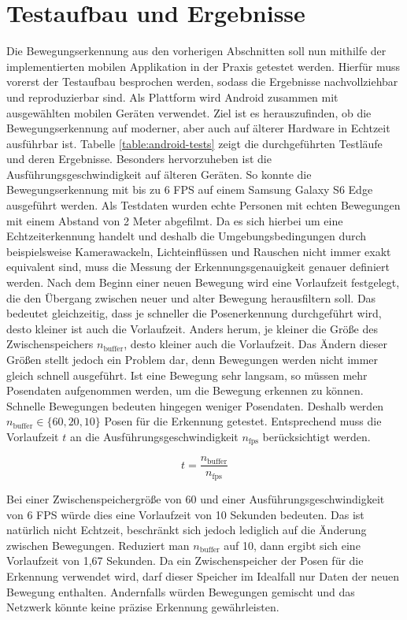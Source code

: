 \section{Testaufbau und Ergebnisse}
Die Bewegungserkennung aus den vorherigen Abschnitten soll nun mithilfe der
implementierten mobilen Applikation in der Praxis getestet werden. Hierfür muss
vorerst der Testaufbau besprochen werden, sodass die Ergebnisse nachvollziehbar
und reproduzierbar sind. Als Plattform wird Android zusammen mit ausgewählten
mobilen Geräten verwendet. Ziel ist es herauszufinden, ob die Bewegungserkennung
auf moderner, aber auch auf älterer Hardware in Echtzeit ausführbar ist. Tabelle
\ref{table:android-tests} zeigt die durchgeführten Testläufe und deren
Ergebnisse. Besonders hervorzuheben ist die Ausführungsgeschwindigkeit auf
älteren Geräten. So konnte die Bewegungserkennung mit bis zu 6 FPS auf einem
Samsung Galaxy S6 Edge ausgeführt werden. Als Testdaten wurden echte Personen
mit echten Bewegungen mit einem Abstand von 2 Meter abgefilmt. Da es sich
hierbei um eine Echtzeiterkennung handelt und deshalb die Umgebungsbedingungen
durch beispielsweise Kamerawackeln, Lichteinflüssen und Rauschen nicht immer
exakt equivalent sind, muss die Messung der Erkennungsgenauigkeit genauer
definiert werden. Nach dem Beginn einer neuen Bewegung wird eine Vorlaufzeit
festgelegt, die den Übergang zwischen neuer und alter Bewegung herausfiltern
soll. Das bedeutet gleichzeitig, dass je schneller die Posenerkennung
durchgeführt wird, desto kleiner ist auch die Vorlaufzeit. Anders herum, je
kleiner die Größe des Zwischenspeichers $n_\mathrm{buffer}$, desto kleiner auch
die Vorlaufzeit. Das Ändern dieser Größen stellt jedoch ein Problem dar, denn
Bewegungen werden nicht immer gleich schnell ausgeführt. Ist eine Bewegung sehr
langsam, so müssen mehr Posendaten aufgenommen werden, um die Bewegung erkennen
zu können. Schnelle Bewegungen bedeuten hingegen weniger Posendaten. Deshalb
werden $n_\mathrm{buffer} \in \{60, 20, 10\}$ Posen für die Erkennung getestet.
Entsprechend muss die Vorlaufzeit $t$ an die Ausführungsgeschwindigkeit
$n_\mathrm{fps}$ berücksichtigt werden. 

\[
    t = \frac{n_\mathrm{buffer}}{n_\mathrm{fps}}
\]

Bei einer Zwischenspeichergröße von 60 und einer Ausführungsgeschwindigkeit von
6 FPS würde dies eine Vorlaufzeit von 10 Sekunden bedeuten. Das ist natürlich
nicht Echtzeit, beschränkt sich jedoch lediglich auf die Änderung zwischen
Bewegungen. Reduziert man $n_\mathrm{buffer}$ auf 10, dann ergibt sich eine Vorlaufzeit von 1,67 Sekunden. Da ein Zwischenspeicher der Posen für die Erkennung verwendet wird,
darf dieser Speicher im Idealfall nur Daten der neuen Bewegung enthalten.
Andernfalls würden Bewegungen gemischt und das Netzwerk könnte keine präzise
Erkennung gewährleisten.

